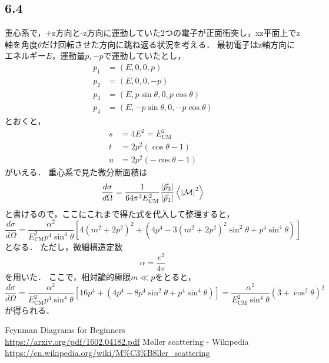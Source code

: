 \subsection*{6.4}
重心系で，+z方向と-z方向に運動していた2つの電子が正面衝突し，xz平面上でz軸を角度$\theta$だけ回転させた方向に跳ね返る状況を考える．
最初電子はz軸方向にエネルギー$E$，運動量$p,-p$で運動していたとし，
\begin{align}
  p_1 &= (E, 0, 0, p) \\
  p_2 &= (E, 0, 0, -p) \\
  p_3 &= (E, p\sin{\theta}, 0, p\cos{\theta}) \\
  p_4 &= (E, -p\sin{\theta}, 0, -p\cos{\theta})
\end{align}
とおくと，
\begin{align}
  s &= 4E^2 = E_{\mathrm{CM}}^2\\
  t &= 2p^2(\cos{\theta}-1)\\
  u &= 2p^2(-\cos{\theta}-1)
\end{align}
がいえる．
重心系で見た微分断面積は
\begin{equation}
  \frac{d\sigma}{d\Omega} = \frac{1}{64\pi^2 E_{\mathrm{CM}}^2} \frac{\left|\vec{p}_3\right|}{\left|\vec{p}_1\right|} \ev{\left|\mathcal{M}\right|^2}
\end{equation}
と書けるので，ここにこれまで得た式を代入して整理すると，
\begin{equation}
  \frac{d\sigma}{d\Omega} = \frac{\alpha^2}{E_{\mathrm{CM}}^2p^4 \sin^4{\theta}} \left[4(m^2+2p^2)^2 + (4p^4 - 3(m^2+2p^2)^2\sin^2{\theta} + p^4\sin^4{\theta})\right]  
\end{equation}
となる．
ただし，微細構造定数
\begin{equation}
  \alpha = \frac{e^2}{4\pi}
\end{equation}
を用いた．
ここで，相対論的極限$m \ll p$をとると，
\begin{equation}
  \frac{d\sigma}{d\Omega} = \frac{\alpha^2}{E_{\mathrm{CM}}^2p^4 \sin^4{\theta}} \left[16p^4 + (4p^4 - 8p^4\sin^2{\theta} + p^4\sin^4{\theta})\right] = \frac{\alpha^2}{E_{\mathrm{CM}}^2 \sin^4{\theta}}(3+\cos^2{\theta})^2
\end{equation}
が得られる．

\begin{thebibliography}{99}
   Feynman Diagrams for Beginners \\
  \url{https://arxiv.org/pdf/1602.04182.pdf}
   M\o ller scattering - Wikipedia \\
  \url{https://en.wikipedia.org/wiki/M%C3%B8ller_scattering}
\end{thebibliography}

